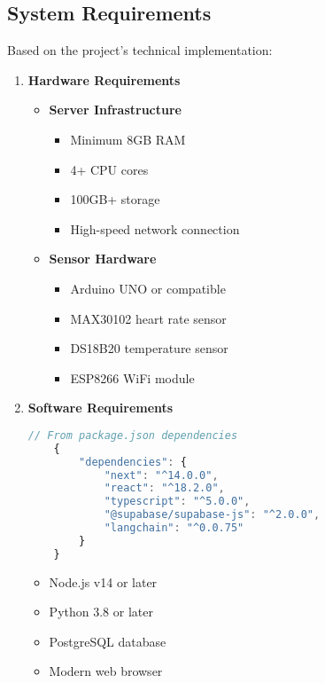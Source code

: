 \subsection{System Requirements}
Based on the project's technical implementation:

\begin{enumerate}
    \item \textbf{Hardware Requirements}
    \begin{itemize}
        \item \textbf{Server Infrastructure}
        \begin{itemize}
            \item Minimum 8GB RAM
            \item 4+ CPU cores
            \item 100GB+ storage
            \item High-speed network connection
        \end{itemize}

        \item \textbf{Sensor Hardware}
        \begin{itemize}
            \item Arduino UNO or compatible
            \item MAX30102 heart rate sensor
            \item DS18B20 temperature sensor
            \item ESP8266 WiFi module
        \end{itemize}
    \end{itemize}

    \item \textbf{Software Requirements}
    \begin{lstlisting}[language=typescript]
    // From package.json dependencies
    {
        "dependencies": {
            "next": "^14.0.0",
            "react": "^18.2.0",
            "typescript": "^5.0.0",
            "@supabase/supabase-js": "^2.0.0",
            "langchain": "^0.0.75"
        }
    }
    \end{lstlisting}
    \begin{itemize}
        \item Node.js v14 or later
        \item Python 3.8 or later
        \item PostgreSQL database
        \item Modern web browser
    \end{itemize}


\end{enumerate}
